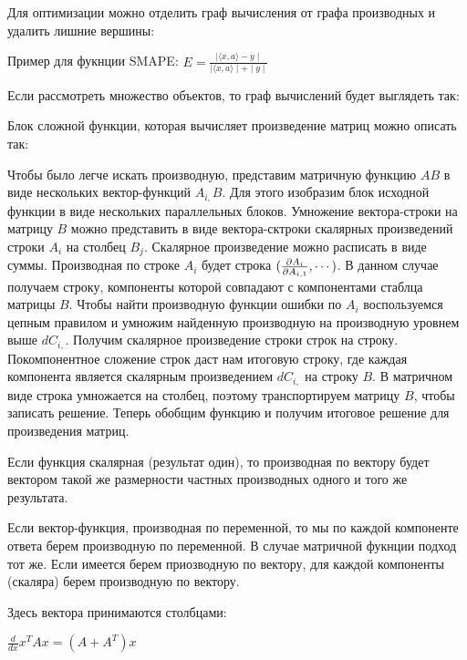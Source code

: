 
Для оптимизации можно отделить граф вычисления от графа производных и удалить
лишние вершины:


Пример для фукнции SMAPE: $E = \frac{\mid \langle x, a \rangle - y \mid}{\mid
\langle x, a \rangle \mid + \mid y \mid}$


Если рассмотреть множество объектов, то граф вычислений будет выглядеть так:


Блок сложной функции, которая вычисляет произведение матриц можно описать так:


Чтобы было легче искать производную, представим матричную функцию $AB$ в виде
нескольких вектор-функций $A_{i,}B$. Для этого изобразим блок исходной функции в виде
нескольких параллельных блоков. Умножение вектора-строки на матрицу $B$ можно
представить в виде вектора-сктроки скалярных произведений строки $A_i$ на
столбец $B_j$. Скалярное произведение можно расписать в виде суммы. Производная
по строке $A_i$ будет строка $(\pade[A_i]{A_{i, 1}}, \cdots)$. В данном случае
получаем строку, компоненты которой совпадают с компонентами стаблца матрицы
$B$. Чтобы найти производную функции ошибки по $A_i$ воспользуемся цепным
правилом и умножим найденную производную на производную уровнем выше $dC_{i,}$.
Получим скалярное произведение строки строк на строку. Покомпонентное сложение
строк даст нам итоговую строку, где каждая компонента является скалярным
произведением $dC_{i,}$ на строку $B$. В матричном виде строка умножается на
столбец, поэтому транспортируем матрицу $B$, чтобы записать решение. Теперь
обобщим функцию и получим итоговое решение для произведения матриц.

Если функция скалярная (результат один), то производная по вектору будет вектором такой же
размерности частных производных одного и того же результата.

Если вектор-функция, производная по переменной, то мы по каждой компоненте
ответа берем производную по переменной. В случае матричной фукнции подход тот же. Если имеется берем приозводную по
вектору, для каждой компоненты (скаляра) берем производную по вектору.

Здесь вектора принимаются столбцами:

$\frac{d}{dx} x^TAx = (A + A^T) x$

